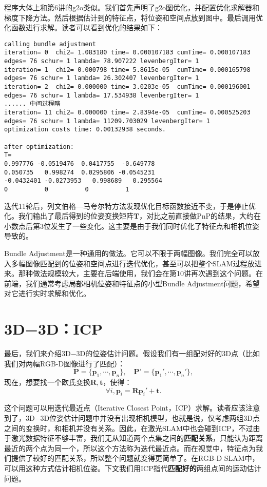 程序大体上和第6讲的g2o类似。我们首先声明了g2o图优化，并配置优化求解器和梯度下降方法。然后根据估计到的特征点，将位姿和空间点放到图中。最后调用优化函数进行求解。读者可以看到优化的结果如下：

\begin{lstlisting}
calling bundle adjustment
iteration= 0  chi2= 1.083180 time= 0.000107183 cumTime= 0.000107183 edges= 76 schur= 1 lambda= 78.907222 levenbergIter= 1
iteration= 1  chi2= 0.000798 time= 5.8615e-05  cumTime= 0.000165798 edges= 76 schur= 1 lambda= 26.302407 levenbergIter= 1
iteration= 2  chi2= 0.000000 time= 3.0203e-05  cumTime= 0.000196001 edges= 76 schur= 1 lambda= 17.534938 levenbergIter= 1
...... 中间过程略
iteration= 11 chi2= 0.000000 time= 2.8394e-05  cumTime= 0.000525203 edges= 76 schur= 1 lambda= 11209.703029 levenbergIter= 1
optimization costs time: 0.00132938 seconds.

after optimization:
T=
0.997776 -0.0519476  0.0417755  -0.649778
0.050735   0.998274  0.0295806 -0.0545231
-0.0432401 -0.0273953   0.998689   0.295564
0          0          0          1
\end{lstlisting}

迭代11轮后，列文伯格—马夸尔特方法发现优化目标函数接近不变，于是停止优化。我们输出了最后得到的位姿变换矩阵$\bm{T}$，对比之前直接做PnP的结果，大约在小数点后第3位发生了一些变化。这主要是由于我们同时优化了特征点和相机位姿导致的。

Bundle Adjustment是一种通用的做法。它可以不限于两幅图像。我们完全可以放入多幅图像匹配到的位姿和空间点进行迭代优化，甚至可以把整个SLAM过程放进来。那种做法规模较大，主要在后端使用，我们会在第10讲再次遇到这个问题。在前端，我们通常考虑局部相机位姿和特征点的小型Bundle Adjustment问题，希望对它进行实时求解和优化。

\section{3D−3D：ICP}
最后，我们来介绍3D−3D的位姿估计问题。假设我们有一组配对好的3D点（比如我们对两幅RGB-D图像进行了匹配）：
\[
\bm{P} = \{ \bm{p}_1, \cdots, \bm{p}_n \}, \quad \bm{P}' = \{ \bm{p}_1', \cdots, \bm{p}_n'\},
\]
\clearpage
现在，想要找一个欧氏变换$\bm{R}, \bm{t}$，使得：
\[
\forall i, \bm{p}_i = \bm{R} \bm{p}_i' + \bm{t}.
\]

这个问题可以用迭代最近点（Iterative Closest Point，ICP）求解。读者应该注意到了，3D−3D位姿估计问题中并没有出现相机模型，也就是说，仅考虑两组3D点之间的变换时，和相机并没有关系。因此，在激光SLAM中也会碰到ICP，不过由于激光数据特征不够丰富，我们无从知道两个点集之间的\textbf{匹配关系}，只能认为距离最近的两个点为同一个，所以这个方法称为迭代最近点。而在视觉中，特征点为我们提供了较好的匹配关系，所以整个问题就变得更简单了。在RGB-D SLAM中，可以用这种方式估计相机位姿。下文我们用ICP指代\textbf{匹配好的}两组点间的运动估计问题。

